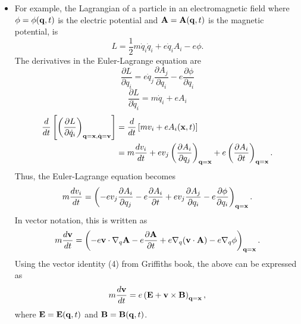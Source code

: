 \documentclass[a4paper,11pt]{report}
\newcommand{\qvecdot}{\dot{\qvec}}
\newcommand{\qdot}{\dot{q}}
\begin{document}
\begin{itemize}
    \item For example, the Lagrangian of a particle in an electromagnetic field where $\phi = \phi(\mathbf{q},t)$ is the electric potential and $\mathbf{A} = \mathbf{A}(\mathbf{q},t)$ is the magnetic potential, is
    \begin{equation}
    L = \frac{1}{2} m \qdot_i \qdot_i + e \qdot_i A_i - e\phi.
    \end{equation}
    The derivatives in the Euler-Lagrange equation are
    \begin{equation}
    \frac{\partial L}{\partial q_i} = e \qdot_j \frac{\partial A_j }{\partial q_i} - e \frac{\partial \phi}{ \partial q_i}
    \end{equation}
    \begin{equation}
    \frac{\partial L}{\partial \qdot_i} = m \qdot_i + e A_i 
    \end{equation}
    \begin{align}
    \frac{d}{dt}\left [ \left ( \frac{\partial L}{\partial \qdot_i } \right )_{\qvec =  \xvec, \qvecdot= \vvec }  \right] &= \frac{d}{dt} \left [ m v_i + e A_i(\xvec,t) \right ] \nonumber \\
    &= m \frac{ d v_i}{dt} + e v_j \left (\frac{\partial A_i}{\partial q_j} \right )_{\qvec = \xvec} +  e \left (\frac{\partial A_i}{\partial t} \right )_{\qvec = \xvec} .
    \end{align}
    Thus, the Euler-Lagrange equation becomes
    \begin{equation}
    \label{eq:lag_mech_tensor_lorentz}
    m \frac{ d v_i}{dt} = \left ( - e v_j \frac{\partial A_i}{\partial q_j} - e\frac{\partial A_i}{\partial t} + e v_j \frac{\partial A_j }{\partial q_i} - e \frac{\partial \phi}{ \partial q_i}\right )_{\mathbf{q} = \mathbf{x}}.
    \end{equation}
    In vector notation, this is written as
    \begin{equation}
        m \frac{d \mathbf{v}}{dt} = \left(-e\mathbf{v} \cdot \nabla_q \mathbf{A} - e \frac{\partial \mathbf{A}}{\partial t} + e \nabla_q (\mathbf{v} \cdot \mathbf{A}) - e \nabla_q \phi \right)_{\mathbf{q} = \mathbf{x}}.
    \end{equation}
    Using the vector identity (4) from Griffiths book, the above can be expressed as
    \begin{equation}
    m \frac{d\mathbf{v}}{dt} = e \left ( \mathbf{E} + \mathbf{v} \times \mathbf{B} \right)_{\mathbf{q} = \mathbf{x}},
    \end{equation}
    where $\mathbf{E} = \mathbf{E}(\mathbf{q},t)$ and $\mathbf{B} = \mathbf{B}(\mathbf{q},t)$.
\end{itemize}
    
\end{document}
